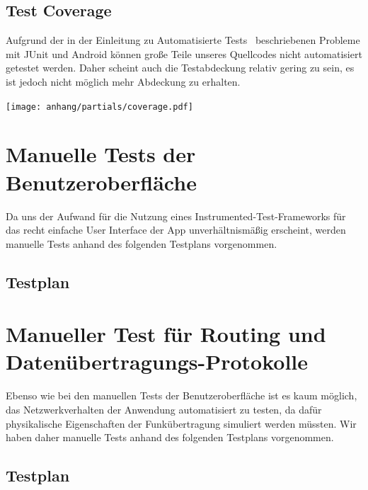 
\subsection{Test Coverage}

Aufgrund der in der Einleitung zu \glqq Automatisierte Tests\grqq~ beschriebenen Probleme mit JUnit und Android können große Teile unseres Quellcodes nicht automatisiert getestet werden. Daher scheint auch die Testabdeckung relativ gering zu sein, es ist jedoch nicht möglich mehr Abdeckung zu erhalten.

\hspace{-1cm}
\texttt{[image: anhang/partials/coverage.pdf]}

\clearpage

\section{Manuelle Tests der Benutzeroberfläche}

Da uns der Aufwand für die Nutzung eines Instrumented-Test-Frameworks
für das recht einfache User Interface der App unverhältnismäßig
erscheint, werden manuelle Tests anhand des folgenden Testplans
vorgenommen.

\subsection{Testplan}





\clearpage
\section{Manueller Test für Routing und Datenübertragungs-Protokolle}

Ebenso wie bei den manuellen Tests der Benutzeroberfläche ist es kaum möglich, das Netzwerkverhalten der Anwendung automatisiert zu testen, da dafür physikalische Eigenschaften der Funkübertragung simuliert werden müssten. Wir haben daher manuelle Tests anhand des folgenden Testplans vorgenommen.

\subsection{Testplan}



